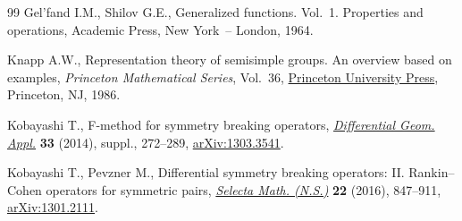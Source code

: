 \begin{thebibliography}{99}
Gel'fand I.M., Shilov G.E., Generalized functions. {V}ol.~1. Properties and
 operations, Academic Press, New York~-- London, 1964.

Knapp A.W., Representation theory of semisimple groups. An overview based on
 examples, \textit{Princeton Mathematical Series}, Vol.~36, \href{https://doi.org/10.1515/9781400883974}{Princeton
 University Press}, Princeton, NJ, 1986.

Kobayashi T., F-method for symmetry breaking operators, \href{https://doi.org/10.1016/j.difgeo.2013.10.003}{\textit{Differential
 Geom. Appl.}} \textbf{33} (2014), suppl., 272--289, \href{https://arxiv.org/abs/1303.3541}{arXiv:1303.3541}.

Kobayashi T., Pevzner M., Differential symmetry breaking operators: {II}.
 {R}ankin--{C}ohen operators for symmetric pairs, \href{https://doi.org/10.1007/s00029-015-0208-8}{\textit{Selecta Math.
 (N.S.)}} \textbf{22} (2016), 847--911, \href{https://arxiv.org/abs/1301.2111}{arXiv:1301.2111}.

\end{thebibliography}
